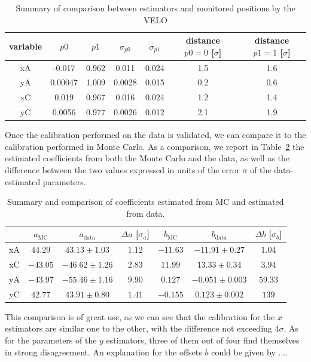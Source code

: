 \begin{table}
    \centering
    \begin{tabular}{c|c|c|c|c|c|c}
    variable  & $p0$ & $p1$ & $\sigma_{p0}$ & $\sigma_{p1}$ & distance $p0=0$ [$\sigma$] & distance $p1=1$ [$\sigma$]\\
    \hline
       xA  & -0.017 & 0.962 & 0.011 & 0.024 & 1.5 & 1.6\\
       yA  & 0.00047 & 1.009 & 0.0028 & 0.015 & 0.2 & 0.6 \\
       xC & 0.019 & 0.967 & 0.016 & 0.024 & 1.2 & 1.4\\
       yC & 0.0056 & 0.977 & 0.0026 & 0.012 & 2.1 & 1.9
    \end{tabular}
    \caption{Summary of comparison between estimators and monitored positions by the VELO}
    \label{tab:summary_velo}
\end{table}

Once the calibration performed on the data is validated, we can compare it to the calibration performed in Monte Carlo. As a comparison, we report in Table~\ref{tab:comparison_coeff} the estimated coefficients from both the Monte Carlo and the data, as well as the difference  between the two values expressed in units of the error $\sigma$ of the data-estimated parameters.

\begin{table}
\centering
\begin{tabular}{
c |
c |
c |
c |
c |
c |
c }
 & $a_{\text{MC}}$ & $a_{\text{data}}$ &  $\Delta a$ [$\sigma_a$] & $b_{\text{MC}}$ &  $b_{\text{data}}$ &  $\Delta b$ [$\sigma_b$] \\ \hline
    { xA} &
  { $44.29$} &
  { $43.13\pm1.03$} &
  $1.12$ &%
  { $-11.63$} &
  { $-11.91\pm0.27$} &
  $1.04$\\%
    { xC} &
  { $-43.05$} &
  { $-46.62\pm1.26$} &
  $2.83$&%
  { $11.99 $} &
  { $13.33\pm0.34$} &
  $3.94$\\%
    { yA} &
  { $-43.97$} &
  { $-55.46\pm 1.16$} &
  $9.90$ &%
  { $0.127 $} &
  { $-0.051\pm0.003$} &
  $59.33$\\%
    { yC} &
  { $42.77 $} &
  { $43.91\pm0.80 $} &
  $1.41$&%
  { $-0.155$} &
  { $0.123\pm0.002 $} &
  $139$%
\end{tabular}
\caption{Summary and comparison of coefficients estimated from MC and estimated from data. }\label{tab:comparison_coeff}
\end{table}
This comparison is of great use, as we can see that the calibration for the $x$ estimators are similar one to the other, with the difference not exceeding $4\sigma$. As for the parameters of the $y$ estimators, three of them out of four find themselves in strong disagreement. An explanation for the offsets $b$ could be given by .... 


